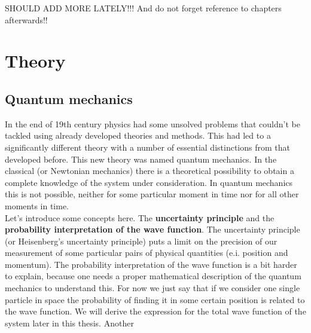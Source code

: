 \documentclass[twoside,english]{uiofysmaster}
\theoremstyle{definition}
\begin{document}
	SHOULD ADD MORE LATELY!!! And do not forget reference to chapters afterwards!!
	
\part{Theory}
\chapter{Quantum mechanics}
In the end of 19th century physics had some unsolved problems that couldn't be tackled using already developed theories and methods. This had led to a  significantly different theory with a number of essential distinctions  from that developed before. This new theory was named quantum mechanics. In the classical (or Newtonian mechanics) there is a theoretical possibility to obtain a complete knowledge of the system under consideration. In quantum mechanics this is not possible, neither for some particular moment in time  nor for all other  moments in time. \\
Let's introduce some concepts here. The \textbf{uncertainty principle} and the \textbf{probability interpretation of the wave function}. The  uncertainty principle (or Heisenberg's uncertainty principle) puts a limit on the precision of our measurement of some particular pairs of physical quantities (e.i. position and momentum). The probability interpretation of the wave function is a bit harder to explain, because one needs a proper mathematical description of the quantum mechanics to understand this. For now we just say that if we consider one single particle in space the probability of finding it in some certain position is related to the wave function. We will derive the expression for the total wave function of the system later in this thesis. Another 
\end{document}
